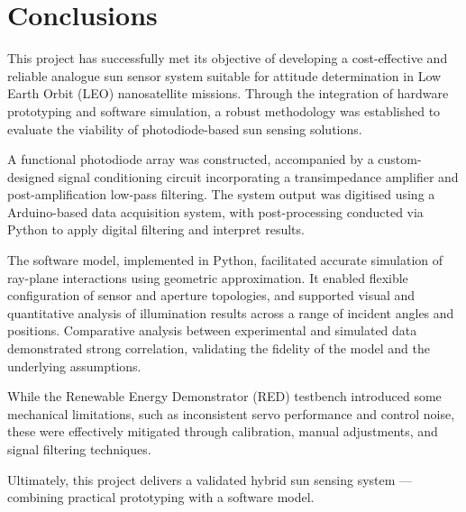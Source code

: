 \chapter{Conclusions}

This project has successfully met its objective of developing a cost-effective and reliable analogue sun sensor system suitable for attitude determination in Low Earth Orbit (LEO) nanosatellite missions. Through the integration of hardware prototyping and software simulation, a robust methodology was established to evaluate the viability of photodiode-based sun sensing solutions.

A functional photodiode array was constructed, accompanied by a custom-designed signal conditioning circuit incorporating a transimpedance amplifier and post-amplification low-pass filtering. The system output was digitised using a Arduino-based data acquisition system, with post-processing conducted via Python to apply digital filtering and interpret results.

The software model, implemented in Python, facilitated accurate simulation of ray-plane interactions using geometric approximation. It enabled flexible configuration of sensor and aperture topologies, and supported visual and quantitative analysis of illumination results across a range of incident angles and positions. Comparative analysis between experimental and simulated data demonstrated strong correlation, validating the fidelity of the model and the underlying assumptions.

While the Renewable Energy Demonstrator (RED) testbench introduced some mechanical limitations, such as inconsistent servo performance and control noise, these were effectively mitigated through calibration, manual adjustments, and signal filtering techniques.

Ultimately, this project delivers a validated hybrid sun sensing system — combining practical prototyping with a software model.
  